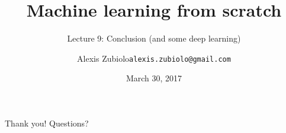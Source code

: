 \documentclass{beamer}
\title{Machine learning from scratch}
\subtitle{Lecture 9: Conclusion (and some deep learning)}
\author{Alexis Zubiolo\newline\texttt{alexis.zubiolo@gmail.com}}
\institute{Data Science Team Lead @ Adcash}
\date{March 30, 2017}
\newcommand{\1}[1]{\mathbbm{1}\left[#1\right]}
\begin{document}
\begin{frame}
  \titlepage
\end{frame}

\begin{frame}
\begin{center}
\Huge{Thank you! Questions?}
\end{center}
\end{frame}
\end{document}

